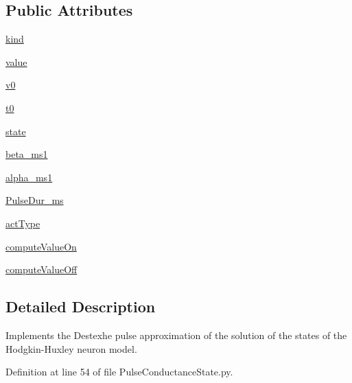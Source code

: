 \subsection*{Public Attributes}
\begin{DoxyCompactItemize}
\item 
\hyperlink{class_pulse_conductance_state_1_1_pulse_conductance_state_a53d237daaa4815ad375e2377da89845e}{kind}
\item 
\hyperlink{class_pulse_conductance_state_1_1_pulse_conductance_state_a832cdff7f315b8c16bef00642fb385dd}{value}
\item 
\hyperlink{class_pulse_conductance_state_1_1_pulse_conductance_state_a215539a3eb60e280225053c83f386d79}{v0}
\item 
\hyperlink{class_pulse_conductance_state_1_1_pulse_conductance_state_a55f44caf230fc3899811924118705f56}{t0}
\item 
\hyperlink{class_pulse_conductance_state_1_1_pulse_conductance_state_ac85aa714a187088e1b31fa2369ed4bca}{state}
\item 
\hyperlink{class_pulse_conductance_state_1_1_pulse_conductance_state_a8ebc0c29d97fa09699d7dfb724e94f82}{beta\+\_\+ms1}
\item 
\hyperlink{class_pulse_conductance_state_1_1_pulse_conductance_state_a5fe4e2c9035df43a1e8eb9d66d669e14}{alpha\+\_\+ms1}
\item 
\hyperlink{class_pulse_conductance_state_1_1_pulse_conductance_state_afda03b180fc3cb619de615632e725a6f}{Pulse\+Dur\+\_\+ms}
\item 
\hyperlink{class_pulse_conductance_state_1_1_pulse_conductance_state_a0677d7b972a6f6a12abc666212a12297}{act\+Type}
\item 
\hyperlink{class_pulse_conductance_state_1_1_pulse_conductance_state_a7f6710b9f97ac5879888402cd5ed15d4}{compute\+Value\+On}
\item 
\hyperlink{class_pulse_conductance_state_1_1_pulse_conductance_state_a89e0cc154bd699aee7529574a8fe556c}{compute\+Value\+Off}
\end{DoxyCompactItemize}


\subsection{Detailed Description}
Implements the Destexhe pulse approximation of the solution of the states of the Hodgkin-\/\+Huxley neuron model. 

Definition at line 54 of file Pulse\+Conductance\+State.\+py.



